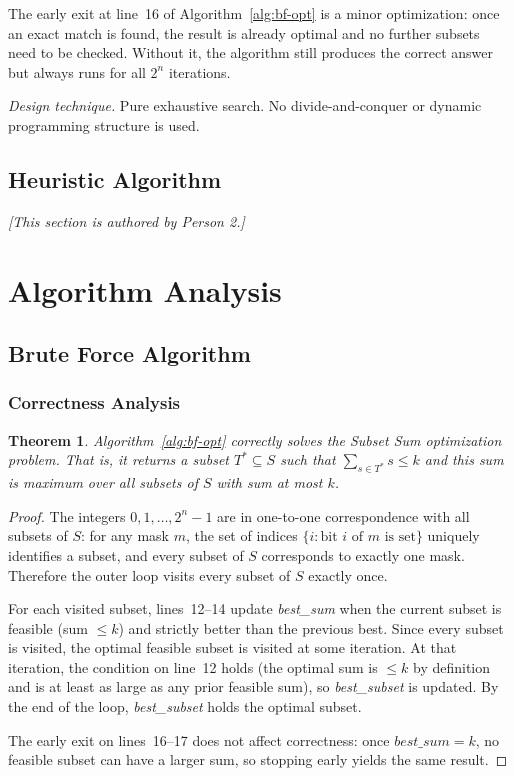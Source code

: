 \documentclass[12pt,a4paper]{article}
\newtheorem{theorem}{Theorem}[section]
\theoremstyle{definition}
\begin{document}
The early exit at line~16 of Algorithm~\ref{alg:bf-opt} is a minor
optimization: once an exact match is found, the result is already optimal and
no further subsets need to be checked. Without it, the algorithm still produces
the correct answer but always runs for all $2^n$ iterations.

\medskip
\noindent\textit{Design technique.} Pure exhaustive search. No divide-and-conquer
or dynamic programming structure is used.

\subsection{Heuristic Algorithm}
\textit{[This section is authored by Person 2.]}


\section{Algorithm Analysis}

\subsection{Brute Force Algorithm}

\subsubsection{Correctness Analysis}

\begin{theorem}
  Algorithm~\ref{alg:bf-opt} correctly solves the Subset Sum optimization
  problem. That is, it returns a subset $T^* \subseteq S$ such that
  $\sum_{s \in T^*} s \leq k$ and this sum is maximum over all subsets of $S$
  with sum at most $k$.
\end{theorem}

\begin{proof}
The integers $0, 1, \ldots, 2^n - 1$ are in one-to-one correspondence with all
subsets of $S$: for any mask $m$, the set of indices $\{i : \text{bit } i
\text{ of } m \text{ is set}\}$ uniquely identifies a subset, and every subset
of $S$ corresponds to exactly one mask. Therefore the outer loop visits every
subset of $S$ exactly once.

For each visited subset, lines~12--14 update \textit{best\_sum} when the current
subset is feasible (sum $\leq k$) and strictly better than the previous best.
Since every subset is visited, the optimal feasible subset is visited at some
iteration. At that iteration, the condition on line~12 holds (the optimal sum
is $\leq k$ by definition and is at least as large as any prior feasible sum),
so \textit{best\_subset} is updated. By the end of the loop,
\textit{best\_subset} holds the optimal subset.

The early exit on lines~16--17 does not affect correctness: once
$\textit{best\_sum} = k$, no feasible subset can have a larger sum, so stopping
early yields the same result.
\end{proof}
\end{document}
